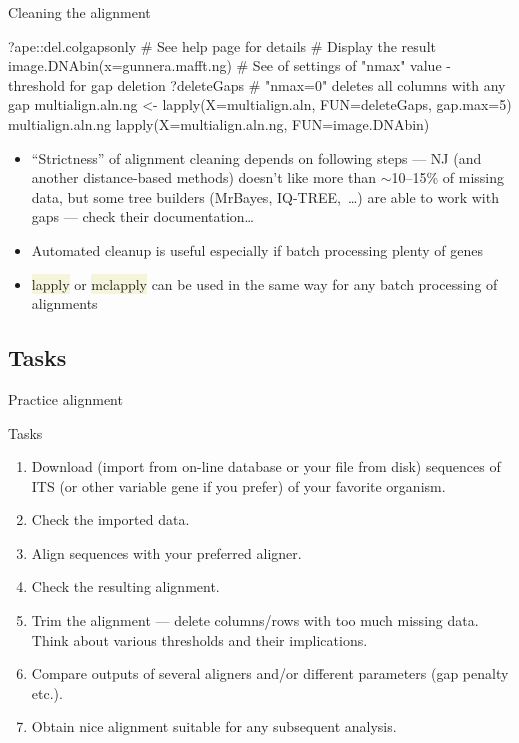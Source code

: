 \documentclass[compress, xelatex, 11pt, xcolor=svgnames, aspectratio=169, url={hyphens, lowtilde}]{beamer}
\renewcommand{\texttt}[1]{\colorbox{Beige}{{\ttfamily #1}}}
\begin{document}
\begin{frame}[fragile]{Cleaning the alignment}
	\begin{spluscode}
    ?ape::del.colgapsonly # See help page for details
    # Display the result
    image.DNAbin(x=gunnera.mafft.ng)
    # See of settings of "nmax" value - threshold for gap deletion
    ?deleteGaps # "nmax=0" deletes all columns with any gap
    multialign.aln.ng <- lapply(X=multialign.aln, FUN=deleteGaps, gap.max=5)
    multialign.aln.ng
    lapply(X=multialign.aln.ng, FUN=image.DNAbin)
	\end{spluscode}
	\vfil
	\begin{itemize}
		\item \enquote{Strictness} of alignment cleaning depends on following steps --- NJ (and another distance-based methods) doesn't like more than $\sim$10--15\% of missing data, but some tree builders (MrBayes, IQ-TREE,~\ldots) are able to work with gaps --- check their documentation\ldots
		\item Automated cleanup is useful especially if batch processing plenty of genes
		\item \texttt{lapply} or \texttt{mclapply} can be used in the same way for any batch processing of alignments
	\end{itemize}
\end{frame}

\subsection{Tasks}

\begin{frame}[fragile]{Practice alignment}
	\begin{exampleblock}{Tasks}
		\begin{enumerate}
			\item Download (import from on-line database or your file from disk) sequences of ITS (or other variable gene if you prefer) of your favorite organism.
			\item Check the imported data.
			\item Align sequences with your preferred aligner.
			\item Check the resulting alignment.
			\item Trim the alignment --- delete columns/rows with too much missing data. Think about various thresholds and their implications.
			\item Compare outputs of several aligners and/or different parameters (gap penalty etc.).
			\item Obtain nice alignment suitable for any subsequent analysis.
		\end{enumerate}
	\end{exampleblock}
\end{frame}
\end{document}
